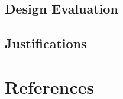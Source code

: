 \documentclass[conference]{IEEEtran}
\begin{document}
\subsection{Design Evaluation}

\subsection{Justifications}

\section*{References}

\end{document}
